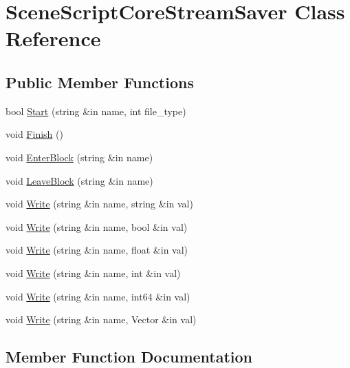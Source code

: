 \hypertarget{class_scene_script_core_stream_saver}{}\section{Scene\+Script\+Core\+Stream\+Saver Class Reference}
\label{class_scene_script_core_stream_saver}
\subsection*{Public Member Functions}
\begin{DoxyCompactItemize}
\item 
bool \hyperlink{class_scene_script_core_stream_saver_a689a9b8b22dbc1b8edfcfee4511da455}{Start} (string \&in name, int file\+\_\+type)
\item 
void \hyperlink{class_scene_script_core_stream_saver_ac97eb97a2d5c27119ddb838aa4a75baa}{Finish} ()
\item 
void \hyperlink{class_scene_script_core_stream_saver_a7ddbe5de7f8234766b5a3de52feba1fb}{Enter\+Block} (string \&in name)
\item 
void \hyperlink{class_scene_script_core_stream_saver_ad168bd91f05d9850da2e42c78e058bb7}{Leave\+Block} (string \&in name)
\item 
void \hyperlink{class_scene_script_core_stream_saver_ac95b305906b61bbff9589888d4cffff5}{Write} (string \&in name, string \&in val)
\item 
void \hyperlink{class_scene_script_core_stream_saver_ab73960b3fec1824762a18dec89c01931}{Write} (string \&in name, bool \&in val)
\item 
void \hyperlink{class_scene_script_core_stream_saver_a12a4bf603bfbbc528d6c1e90309b891a}{Write} (string \&in name, float \&in val)
\item 
void \hyperlink{class_scene_script_core_stream_saver_a0d0b6206baf370e82da58c66146a4ef5}{Write} (string \&in name, int \&in val)
\item 
void \hyperlink{class_scene_script_core_stream_saver_a9d2b18c1f2989334e3d2919e7458d244}{Write} (string \&in name, int64 \&in val)
\item 
void \hyperlink{class_scene_script_core_stream_saver_a31fa71fcfd64aeb1e6195a0a66020e0d}{Write} (string \&in name, Vector \&in val)
\end{DoxyCompactItemize}


\subsection{Member Function Documentation}
\hypertarget{class_scene_script_core_stream_saver_a7ddbe5de7f8234766b5a3de52feba1fb}{}\label{class_scene_script_core_stream_saver_a7ddbe5de7f8234766b5a3de52feba1fb} 
